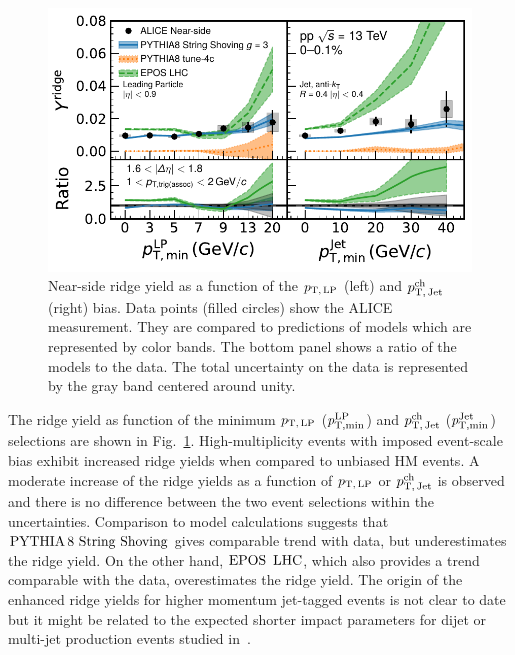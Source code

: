 \begin{figure}[h!]
	\centering
	\includegraphics[width=0.89\linewidth]{./figures/Fig6_RidgeYieldESE.pdf}
	\caption{Near-side ridge yield as a function of the $p_\mathrm{T,\,LP}$ (left) and $p_\mathrm{T,\,Jet}^\mathrm{ch}$ (right) bias. Data points (filled circles) show the ALICE measurement. They are compared to predictions of models which are represented by color bands. The bottom panel shows a ratio of the models to the data. The total uncertainty on the data is represented by the gray band centered around unity.}
	\label{fig:RidgeYield_ESE}
\end{figure}

The ridge yield as function of the minimum $p_\mathrm{T,\,LP}$ ($\it{p}^{\rm{LP}}_{\rm{T,min}}$) and $p_\mathrm{T,\,Jet}^\mathrm{ch}$ ($\it{p}^{\rm{Jet}}_{\rm{T,min}}$) selections are shown in Fig.~\ref{fig:RidgeYield_ESE}. High-multiplicity events with imposed event-scale bias exhibit increased ridge yields when compared to unbiased HM events. A moderate increase of the ridge yields as a function of $p_\mathrm{T,\,LP}$ or $p_\mathrm{T,\,Jet}^\mathrm{ch}$ is observed and there is no difference between the two event selections within the uncertainties.
Comparison to model calculations suggests that ${\mathrm{PYTHIA}\,8~\mathrm{String}~}\mathrm{Shoving}$ gives comparable trend with data, but underestimates the ridge yield. On the other hand, ${\mathrm{EPOS}\,~\mathrm{LHC}}$, which also provides a trend comparable with the data, overestimates the ridge yield. The origin of the enhanced ridge yields for higher momentum jet-tagged events is not clear to date but it might be related to the expected shorter impact parameters for dijet or multi-jet production events studied in~\cite{Frankfurt:2010ea}.

